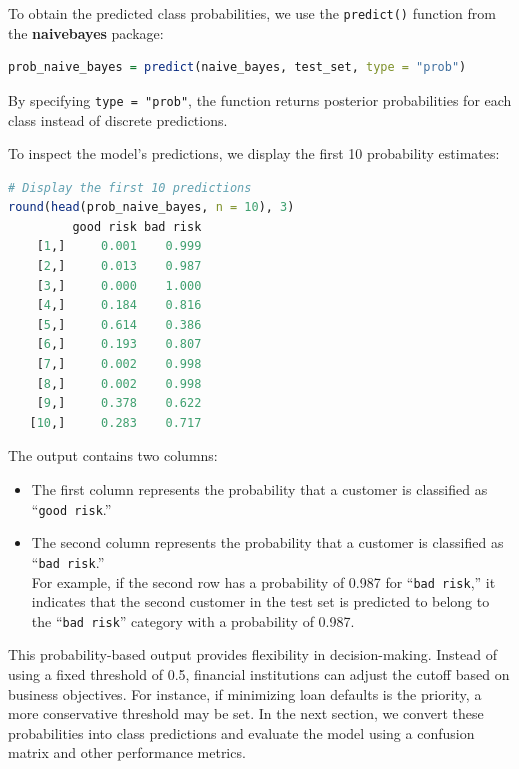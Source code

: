 \documentclass[
  11pt,
]{book}
\newcommand{\passthrough}[1]{#1}
\providecommand{\tightlist}{%
  \setlength{\itemsep}{0pt}\setlength{\parskip}{0pt}}
\theoremstyle{definition}
\theoremstyle{definition}
\theoremstyle{definition}
\theoremstyle{definition}
\theoremstyle{remark}
\begin{document}
To obtain the predicted class probabilities, we use the \passthrough{\lstinline!predict()!} function from the \textbf{naivebayes} package:

\begin{lstlisting}[language=R]
prob_naive_bayes = predict(naive_bayes, test_set, type = "prob")
\end{lstlisting}

By specifying \passthrough{\lstinline!type = "prob"!}, the function returns posterior probabilities for each class instead of discrete predictions.

To inspect the model's predictions, we display the first 10 probability estimates:

\begin{lstlisting}[language=R]
# Display the first 10 predictions
round(head(prob_naive_bayes, n = 10), 3)
         good risk bad risk
    [1,]     0.001    0.999
    [2,]     0.013    0.987
    [3,]     0.000    1.000
    [4,]     0.184    0.816
    [5,]     0.614    0.386
    [6,]     0.193    0.807
    [7,]     0.002    0.998
    [8,]     0.002    0.998
    [9,]     0.378    0.622
   [10,]     0.283    0.717
\end{lstlisting}

The output contains two columns:

\begin{itemize}
\tightlist
\item
  The first column represents the probability that a customer is classified as ``\passthrough{\lstinline!good risk!}.''
\item
  The second column represents the probability that a customer is classified as ``\passthrough{\lstinline!bad risk!}.''\\
  For example, if the second row has a probability of 0.987 for ``\passthrough{\lstinline!bad risk!},'' it indicates that the second customer in the test set is predicted to belong to the ``\passthrough{\lstinline!bad risk!}'' category with a probability of 0.987.
\end{itemize}

This probability-based output provides flexibility in decision-making. Instead of using a fixed threshold of 0.5, financial institutions can adjust the cutoff based on business objectives. For instance, if minimizing loan defaults is the priority, a more conservative threshold may be set. In the next section, we convert these probabilities into class predictions and evaluate the model using a confusion matrix and other performance metrics.
\end{document}
